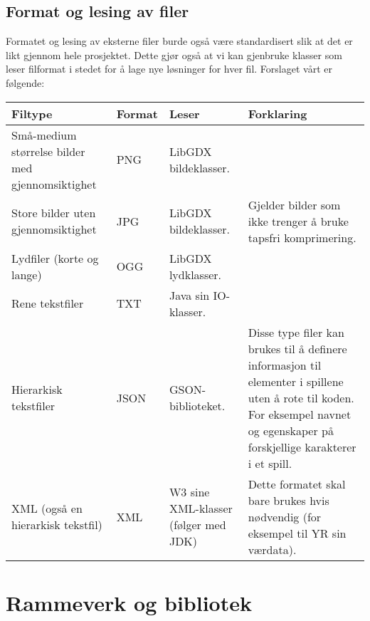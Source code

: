 \documentclass[12pt]{report}
\begin{document}
\newpage
\subsection*{Format og lesing av filer}

Formatet og lesing av eksterne filer burde ogs{\aa} v{\ae}re standardisert slik at det er likt gjennom hele prosjektet.
Dette gj{\o}r ogs{\aa} at vi kan gjenbruke klasser som leser filformat i stedet for {\aa} lage nye l{\o}sninger for
hver fil. Forslaget v{\aa}rt er f{\o}lgende: \\

\begin{center}
\begin{tabular}{ | m{5cm} | m{1cm} | m{4cm} | m{5cm} |}
\hline
Filtype & Format & Leser & Forklaring\\
\hline

Sm{\aa}-medium st{\o}rrelse bilder med gjennomsiktighet & PNG & LibGDX bildeklasser. & ~ \\
\hline

Store bilder uten gjennomsiktighet & JPG & LibGDX bildeklasser. &
Gjelder bilder som ikke trenger {\aa} bruke tapsfri komprimering. \\
\hline

Lydfiler (korte og lange) & OGG & LibGDX lydklasser. & ~ \\
\hline

Rene tekstfiler & TXT & Java sin IO-klasser. & ~ \\
\hline

Hierarkisk tekstfiler & JSON & GSON-biblioteket. &
Disse type filer kan brukes til {\aa} definere informasjon til elementer i spillene uten {\aa} rote til koden. For
eksempel navnet og egenskaper p{\aa} forskjellige karakterer i et spill. \\
\hline

XML (ogs{\aa} en hierarkisk tekstfil) & XML & W3 sine XML-klasser (f{\o}lger med JDK) &
Dette formatet skal bare brukes hvis n{\o}dvendig (for eksempel til YR sin v{\ae}rdata).\\
\hline
\end{tabular}
\end{center}

\newpage
\section*{Rammeverk og bibliotek}
\end{document}
